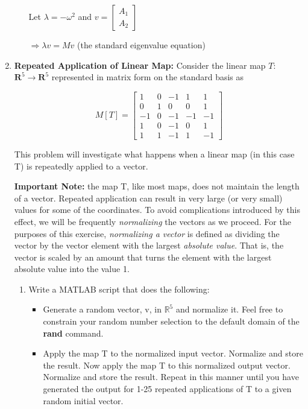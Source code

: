 \documentclass[fleqn]{article}
\makeatletter
\newenvironment{equationCenter}{\@fleqnfalse\begin{equation*}}{\end{equation*}}
\makeatother
\begin{document}
\begin{enumerate}[nolistsep]
\begin{enumerate}[nolistsep]
				Let $\lambda = -{\omega}^2$ and $v = \begin{bmatrix} A_1 \\ A_2 \end{bmatrix}$
				
				$\Rightarrow {\lambda}v = Mv$ (the standard eigenvalue equation)
			\end{enumerate}
		\item \textbf{Repeated Application of Linear Map:} Consider the linear map $T$: $\mathbf{R}^5 \rightarrow \mathbf{R}^5$ represented in matrix form on the standard basis as
		
			\begin{equationCenter}
				M[T] = \begin{bmatrix}
					1 &  0 & -1 &  1 &  1\\
					0 &  1 &  0 &  0 &  1\\
				   -1 &  0 & -1 & -1 & -1\\
				    1 &  0 & -1 &  0 &  1\\
				    1 &  1 & -1 &  1 & -1
				\end{bmatrix}
			\end{equationCenter}
			
			This problem will investigate what happens when a linear map (in this case T) is repeatedly applied to a vector.
			
			\textbf{Important Note:} the map T, like most maps, does not maintain the length of a vector. Repeated application can result in very large (or very small) values for some of the coordinates. To avoid complications introduced by this effect, we will be frequently \textit{normalizing} the vectors as we proceed. For the purposes of this exercise, \textit{normalizing a vector} is defined as dividing the vector by the vector element with the largest \textit{absolute value}. That is, the vector is scaled by an amount that turns the element with the largest absolute value into the value 1.
			
			\begin{enumerate}
				\item Write a MATLAB script that does the following:
					\begin{itemize}
						\item Generate a random vector, v, in $\mathbb{R}^5$ and normalize it. Feel free to constrain your random number selection to the default domain of the \textbf{rand} command.
						
						\item Apply the map T to the normalized input vector. Normalize and store the result. Now apply the map T to this normalized output vector. Normalize and store the result. Repeat in this manner until you have generated the output for 1-25 repeated applications of T to a given random initial vector.
					\end{itemize}
					

\end{enumerate}
\end{enumerate}
\end{document}
